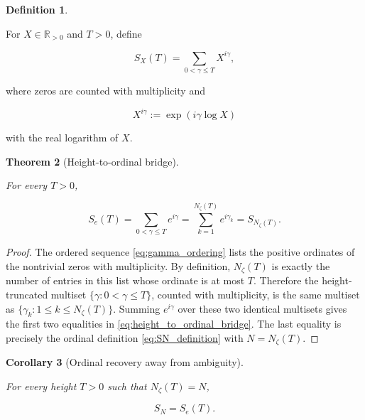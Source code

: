 \documentclass[11pt]{amsart}
\numberwithin{equation}{section}
\theoremstyle{plain}
\newtheorem{theorem}{Theorem}[section]
\newtheorem{corollary}[theorem]{Corollary}
\theoremstyle{definition}
\newtheorem{definition}[theorem]{Definition}
\theoremstyle{remark}
\begin{document}
\begin{definition}
\label{def:continuous_height_phase_sum}

For \(X\in\mathbb{R}_{>0}\) and \(T>0\), define

\begin{equation}
S_X(T)
=
\sum_{0<\gamma\leq T}X^{i\gamma},
\label{eq:continuous_height_phase_sum}
\end{equation}

where zeros are counted with multiplicity and

\begin{equation}
X^{i\gamma}:=\exp(i\gamma\log X)
\label{eq:continuous_power_real_log}
\end{equation}

with the real logarithm of \(X\).

\end{definition}

\begin{theorem}[Height-to-ordinal bridge]
\label{thm:height_to_ordinal_bridge}

For every \(T>0\),

\begin{equation}
S_e(T)
=
\sum_{0<\gamma\leq T}e^{i\gamma}
=
\sum_{k=1}^{N_\zeta(T)}e^{i\gamma_k}
=
S_{N_\zeta(T)}.
\label{eq:height_to_ordinal_bridge}
\end{equation}

\end{theorem}

\begin{proof}
The ordered sequence \eqref{eq:gamma_ordering} lists the positive
ordinates of the nontrivial zeros with multiplicity. By definition,
\(N_\zeta(T)\) is exactly the number of entries in this list whose
ordinate is at most \(T\). Therefore the height-truncated multiset
\(\{\gamma:0<\gamma\leq T\}\), counted with multiplicity, is the same
multiset as \(\{\gamma_k:1\leq k\leq N_\zeta(T)\}\). Summing
\(e^{i\gamma}\) over these two identical multisets gives the first two
equalities in \eqref{eq:height_to_ordinal_bridge}. The last equality is
precisely the ordinal definition \eqref{eq:SN_definition} with
\(N=N_\zeta(T)\).
\end{proof}

\begin{corollary}[Ordinal recovery away from ambiguity]
\label{cor:ordinal_recovery_from_height}

For every height \(T>0\) such that \(N_\zeta(T)=N\),

\begin{equation}
S_N=S_e(T).
\label{eq:ordinal_recovery_from_height}
\end{equation}

\end{corollary}
\end{document}
